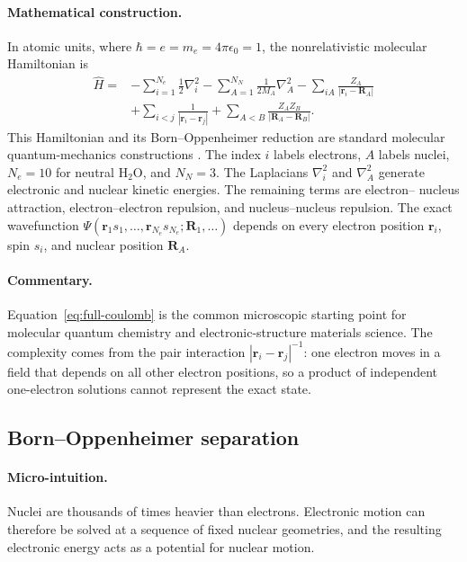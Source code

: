 \documentclass[10pt,twocolumn]{article}
\newcommand{\micro}{\paragraph{Micro-intuition.}}
\newcommand{\mathderiv}{\paragraph{Mathematical construction.}}
\newcommand{\commentaryblock}{\paragraph{Commentary.}}
\begin{document}
\mathderiv In atomic units, where $\hbar=e=m_e=4\pi\epsilon_0=1$, the
nonrelativistic molecular Hamiltonian is
\begin{align}
\hat H={}&-\sum_{i=1}^{N_e}\frac12\nabla_i^2
-\sum_{A=1}^{N_N}\frac{1}{2M_A}\nabla_A^2
-\sum_{iA}\frac{Z_A}{|\mathbf r_i-\mathbf R_A|}\nonumber\\
&+\sum_{i<j}\frac{1}{|\mathbf r_i-\mathbf r_j|}
+\sum_{A<B}\frac{Z_AZ_B}{|\mathbf R_A-\mathbf R_B|}.
\label{eq:full-coulomb}
\end{align}
This Hamiltonian and its Born--Oppenheimer reduction are standard molecular
quantum-mechanics constructions \cite{BornOppenheimer,SzaboOstlund}.
The index $i$ labels electrons, $A$ labels nuclei, $N_e=10$ for neutral
H$_2$O, and $N_N=3$.  The Laplacians $\nabla_i^2$ and $\nabla_A^2$ generate
electronic and nuclear kinetic energies.  The remaining terms are electron--
nucleus attraction, electron--electron repulsion, and nucleus--nucleus
repulsion.  The exact wavefunction
$\Psi(\mathbf r_1s_1,\ldots,\mathbf r_{N_e}s_{N_e};\mathbf R_1,\ldots)$
depends on every electron position $\mathbf r_i$, spin $s_i$, and nuclear
position $\mathbf R_A$.

\commentaryblock Equation~\eqref{eq:full-coulomb} is the common microscopic
starting point for molecular quantum chemistry and electronic-structure
materials science.  The complexity comes from the pair interaction
$|\mathbf r_i-\mathbf r_j|^{-1}$: one electron moves in a field that depends on
all other electron positions, so a product of independent one-electron
solutions cannot represent the exact state.

\subsection*{Born--Oppenheimer separation}

\micro Nuclei are thousands of times heavier than electrons.  Electronic
motion can therefore be solved at a sequence of fixed nuclear geometries, and
the resulting electronic energy acts as a potential for nuclear motion.
\end{document}
